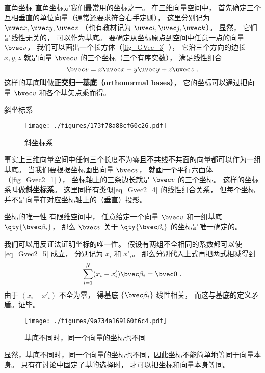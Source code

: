 \begin{example}{直角坐标}
直角坐标是我们最常用的坐标之一。 在三维向量空间中， 首先确定三个互相垂直的单位向量（通常还要求符合右手定则）， 这里分别记为 $\uvec x, \uvec y, \uvec z$ （也有教材记为 $\uvec i, \uvec j, \uvec k$）。 显然， 它们是线性无关的， 可以作为基底。 要确定从坐标原点到空间中任意一点的向量 $\bvec v$， 我们可以画出一个长方体（\autoref{fig_GVec_3}~）， 它沿三个方向的边长 $x, y, z$ 就是向量 $\bvec v$ 的三个坐标（三个有序实数）， 满足线性组合
\begin{equation}\label{eq_Gvec2_4}
\bvec v = x\uvec x + y\uvec y + z\uvec z~.
\end{equation}
这样的基底叫做\textbf{正交归一基底（orthonormal bases）}， 它的坐标可以通过把向量 $\bvec v$ 和各个基矢点乘而得。
\end{example}

\begin{example}{斜坐标系}\label{ex_Gvec2_1}
\begin{figure}[ht]
\centering
\texttt{[image: ./figures/173f78a88cf60c26.pdf]}
\caption{斜坐标系} \label{fig_Gvec2_1}
\end{figure}
事实上三维向量空间中任何三个长度不为零且不共线不共面的向量都可以作为一组基底。 当我们要根据坐标画出向量 $\bvec v$， 就画一个平行六面体（\autoref{fig_Gvec2_1} ）， 坐标轴上的三条边长就是 $\bvec v$ 的三个坐标。 这样的坐标系叫做\textbf{斜坐标系}。 这里同样有类似\autoref{eq_Gvec2_4} 的线性组合关系， 但每个坐标并不是向量在对应坐标轴上的（垂直）投影。
\end{example}

\begin{theorem}{坐标的唯一性}
有限维空间中， 任意给定一个向量 $\bvec v$ 和一组基底 $\qty{\bvec \beta_i}$， 那么 $\bvec v$ 关于 $\qty{\bvec \beta_i}$ 的坐标是唯一确定的。
\end{theorem}
我们可以用反证法证明坐标的唯一性。 假设有两组不全相同的系数都可以使\autoref{eq_Gvec2_5} 成立， 分别记为 $x_i$ 和 $x'_i$。 那么分别代入上式再把两式相减得到
\begin{equation}
\sum_{i=1}^N (x_i-x'_i) \bvec \beta_i = \bvec 0~.
\end{equation}
由于 $(x_i-x'_i)$ 不全为零， 得基底 $\{\bvec \beta_i\}$ 线性相关， 而这与基底的定义矛盾。证毕。
\begin{figure}[ht]
\centering
\texttt{[image: ./figures/9a734a169160f6c4.pdf]}
\caption{基底不同时，同一个向量的坐标也不同} \label{fig_Gvec2_2}
\end{figure}
显然，基底不同时，同一个向量的坐标也不同，因此坐标不能简单地等同于向量本身。 只有在讨论中固定了基的选择时， 才可以把坐标和向量本身等同。


